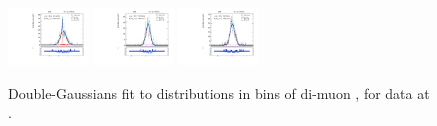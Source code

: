 \begin{figure}[htb]
\includegraphics[width=0.19\textwidth]{plots/Appendix_Recoil_Fits/ZmmData_PF_5TeV_2G_bkg/pfu1fit_32.pdf}
\includegraphics[width=0.19\textwidth]{plots/Appendix_Recoil_Fits/ZmmData_PF_5TeV_2G_bkg/pfu1fit_33.pdf}
\includegraphics[width=0.19\textwidth]{plots/Appendix_Recoil_Fits/ZmmData_PF_5TeV_2G_bkg/pfu1fit_34.pdf}
\caption{Double-Gaussians fit to \upar distributions in bins of di-muon \pt, for \zmm data at \serag.}
\label{fig:a:recoil:fit:data:u1:5}
\end{figure}
